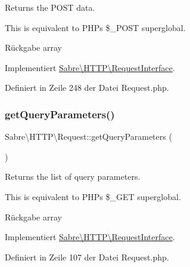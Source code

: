 Returns the P\+O\+ST data.

This is equivalent to P\+HP\textquotesingle{}s \$\+\_\+\+P\+O\+ST superglobal.

\begin{DoxyReturn}{Rückgabe}
array 
\end{DoxyReturn}


Implementiert \mbox{\hyperlink{interface_sabre_1_1_h_t_t_p_1_1_request_interface_ae33360454f0d43e566b76de24682af33}{Sabre\textbackslash{}\+H\+T\+T\+P\textbackslash{}\+Request\+Interface}}.



Definiert in Zeile 248 der Datei Request.\+php.

\mbox{\label{class_sabre_1_1_h_t_t_p_1_1_request_a2bf1d2de1af4871f761aa0f8a3b2d2cc}} 
\subsubsection{\texorpdfstring{get\+Query\+Parameters()}{getQueryParameters()}}
{\footnotesize\ttfamily Sabre\textbackslash{}\+H\+T\+T\+P\textbackslash{}\+Request\+::get\+Query\+Parameters (\begin{DoxyParamCaption}{ }\end{DoxyParamCaption})}

Returns the list of query parameters.

This is equivalent to P\+HP\textquotesingle{}s \$\+\_\+\+G\+ET superglobal.

\begin{DoxyReturn}{Rückgabe}
array 
\end{DoxyReturn}


Implementiert \mbox{\hyperlink{interface_sabre_1_1_h_t_t_p_1_1_request_interface_a9e54c49278b75692ba00bd4f5932856f}{Sabre\textbackslash{}\+H\+T\+T\+P\textbackslash{}\+Request\+Interface}}.



Definiert in Zeile 107 der Datei Request.\+php.

\mbox{\label{class_sabre_1_1_h_t_t_p_1_1_request_abee040c0f5f18db19b5503c2c4f3379a}} 
